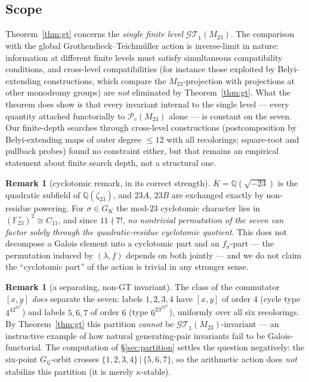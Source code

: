 \documentclass[11pt]{amsart}
\newcommand{\QQ}{\mathbb{Q}}
\newcommand{\GQ}{G_{\QQ}}
\newcommand{\GK}{G_{K}}
\newcommand{\Mtw}{M_{23}}
\newcommand{\sqm}{\sqrt{-23}}
\newcommand{\kap}{\kappa}
\theoremstyle{plain}
\theoremstyle{definition}
\newtheorem{remark}[theorem]{Remark}
\begin{document}
\subsection*{Scope}
Theorem~\ref{thm:gt} concerns the \emph{single finite level}
$\mathcal{GT}_1(\Mtw)$. The comparison with the global
Grothendieck--Teichm\"uller action is inverse-limit in nature:
information at different finite levels must satisfy simultaneous
compatibility conditions, and cross-level compatibilities (for
instance those
exploited by Belyi-extending constructions, which compare the
$\Mtw$-projection with projections at other monodromy groups) are
\emph{not} eliminated by Theorem~\ref{thm:gt}. What the theorem does
show is that every invariant internal to the single level ---
every quantity attached functorially to
$\mathscr{P}_c(\Mtw)$ alone --- is constant on the seven. Our
finite-depth searches through cross-level constructions
(postcomposition by Belyi-extending maps of outer degree $\le 12$
with all recolorings; square-root and pullback probes) found no
constraint either, but that remains an empirical statement about
finite search depth, not a structural one.

\begin{remark}[cyclotomic remark, in its correct strength]
$K=\QQ(\sqm)$ is the quadratic subfield of $\QQ(\zeta_{23})$, and
$23A$, $23B$ are exchanged exactly by non-residue powering. For
$\sigma\in\GK$ the mod-$23$ cyclotomic character lies in
$(\mathbb{F}_{23}^\times)^2\cong C_{11}$, and since $11\nmid 7!$,
\emph{no nontrivial permutation of the seven can factor solely
through the quadratic-residue cyclotomic quotient}. This does not
decompose a Galois element into a cyclotomic part and an
$f_\sigma$-part --- the permutation induced by $(\lambda,f)$ depends
on both jointly --- and we do not claim the ``cyclotomic part'' of
the action is trivial in any stronger sense.
\end{remark}

\begin{remark}[a separating, non-GT invariant]\label{rem:commutator}
The class of the commutator $[x,y]$ \emph{does} separate the seven:
labels $1,2,3,4$ have $[x,y]$ of order $4$ (cycle type
$4^42^21^3$) and labels $5,6,7$ of order $6$ (type $6^23^22^21$),
uniformly over all six recolorings. By Theorem~\ref{thm:gt} this
partition \emph{cannot} be $\mathcal{GT}_1(\Mtw)$-invariant --- an
instructive example of how natural generating-pair invariants fail
to be Galois-functorial. The computation of
\S\ref{sec:partition} settles the question negatively: the
six-point $\GQ$-orbit crosses $\{1,2,3,4\}\,|\,\{5,6,7\}$, so the
arithmetic action does \emph{not} stabilize this partition (it is
merely $\kap$-stable).
\end{remark}
\end{document}
